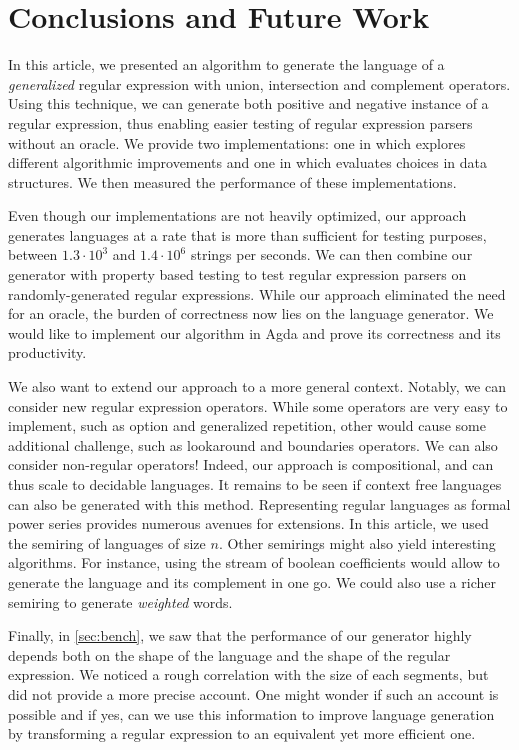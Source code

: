\section{Conclusions and Future Work}
\label{sec:conclusions}

In this article, we presented an algorithm to generate the language
of a \emph{generalized} regular expression with union, intersection
and complement operators. Using this technique, we can generate both
positive and negative instance of a regular expression, thus enabling
easier testing of regular expression parsers without an oracle.
We provide two implementations: one in \haskell which explores
different algorithmic improvements and one in \ocaml which evaluates choices
in data structures. We then measured the performance of these implementations.

Even though our implementations are not heavily optimized, our approach generates
languages at a rate that is more than sufficient for testing
purposes, between $1.3\cdot10^3$ and $1.4\cdot10^6$ strings per seconds.
We can then combine our generator with property based testing
to test regular expression parsers on randomly-generated regular expressions.
While our approach eliminated the need for an oracle, the burden of correctness
now lies on the language generator. We would like to implement our algorithm
in Agda and prove its correctness and its productivity.

We also want to extend our approach to a more general context.
Notably, we can consider new regular expression operators.
While some operators are very easy to implement, such as option and generalized repetition,
other would cause some additional challenge, such as lookaround and boundaries
operators. We can also consider non-regular operators! Indeed, our approach
is compositional, and can thus scale to decidable languages.
It remains to be seen if context free languages can also be generated
with this method.
Representing regular languages as formal power series provides numerous avenues
for extensions. In this article, we used the semiring
of languages of size $n$. Other semirings might also yield interesting
algorithms. For instance, using the stream of boolean coefficients would
allow to generate the language and its complement in one go. We could
also use a richer semiring to generate \emph{weighted} words.

Finally, in \cref{sec:bench}, we saw that the performance of our
generator highly depends
both on the shape of the language and the shape of the regular expression.
We noticed a rough correlation with the size of each segments, but did not
provide a more precise account. One might wonder if such an account is possible
and if yes, can we use this information to improve language generation
by transforming a regular expression to an equivalent yet more efficient one.

